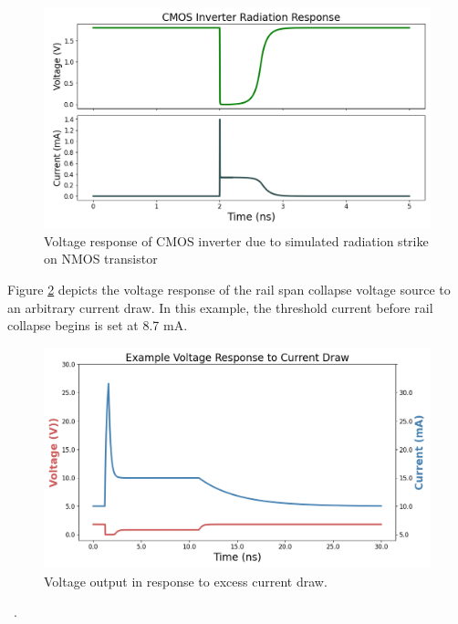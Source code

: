 \documentclass[conference]{IEEEtran}
\begin{document}
        \begin{figure}[htbp]
        \centering
        \includegraphics[width=0.95\linewidth]{Inverter_Response}
        \caption{Voltage response of CMOS inverter due to simulated radiation strike on NMOS transistor}
        \label{fig:inverter_response}
    \end{figure}
    
Figure \ref{fig:rail_collapse_response} depicts the voltage response of the rail span collapse voltage source to an arbitrary current draw. In this example, the threshold current before rail collapse begins is set at 8.7 mA.

    \begin{figure}[htbp]
        \centering
        \includegraphics[width=0.95\linewidth]{Rail_Collapse_Response}
        \caption{Voltage output in response to excess current draw.}
        \label{fig:rail_collapse_response}
    \end{figure}~\cite{Massengill1984}.


\end{document}

